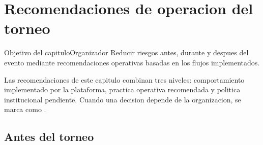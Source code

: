 \chapter{Recomendaciones de operacion del torneo}
\label{cap:recomendaciones-torneo}

\begin{procedimiento}{Objetivo del capitulo}{Organizador}
Reducir riesgos antes, durante y despues del evento mediante recomendaciones operativas basadas en los flujos implementados.
\end{procedimiento}

Las recomendaciones de este capitulo combinan tres niveles: comportamiento implementado por la plataforma, practica operativa recomendada y politica institucional pendiente. Cuando una decision depende de la organizacion, se marca como .

\section{Antes del torneo}

